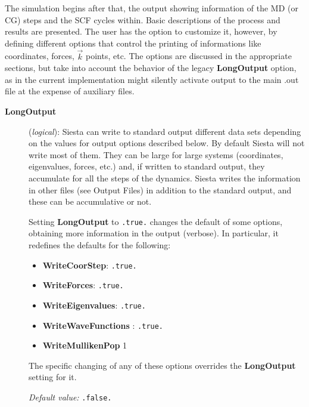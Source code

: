 \documentclass[11pt]{article}
\begin{document}
The simulation begins after that, the output showing information of
the MD (or CG) steps and the SCF cycles within.  Basic descriptions of
the process and results are presented. The user has the option to
customize it, however, by defining
different options that control the printing of informations like
coordinates, forces, $\vec k$ points, etc.  The options are discussed
in the appropriate sections, but take into account the behavior of the
legacy {\bf LongOutput} option, as in the current implementation might
silently activate output to the main .out file at the expense of
auxiliary files.

\begin{description}

\item[{\bf LongOutput}] ({\it logical}):
{\sc Siesta} can write to standard output different data sets
depending on the values for output options described below.
By default {\sc Siesta} will not write most of them. They can be
large for large systems (coordinates, eigenvalues, forces, etc.)
and, if written to standard output, they accumulate for all the steps of 
the dynamics. {\sc Siesta} writes the information in other files
(see Output Files) in addition to the standard output, and these
can be accumulative or not.

Setting {\bf LongOutput} to {\tt .true.} changes the default of
some options, obtaining more information in the output (verbose).
In particular, it redefines the defaults for the following:

\begin{itemize}

\item
{\bf WriteCoorStep}:
 {\tt .true.}
\item
{\bf WriteForces}:
 {\tt .true.}
\item
{\bf WriteEigenvalues}:
 {\tt .true.}
\item
{\bf WriteWaveFunctions}
:
 {\tt .true.}
\item
{\bf WriteMullikenPop} 
 1
\end{itemize}

The specific changing of any of these options overrides the
{\bf LongOutput} setting for it.

{\it Default value:} {\tt .false.}

\end{description}
\end{document}
